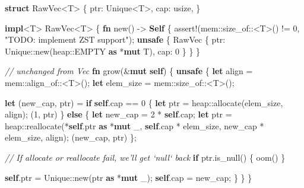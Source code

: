\documentclass[a4paper,]{book}
\newenvironment{Shaded}{\begin{snugshade}}{\end{snugshade}}
\newcommand{\KeywordTok}[1]{\textcolor[rgb]{0.13,0.29,0.53}{\textbf{{#1}}}}
\newcommand{\DecValTok}[1]{\textcolor[rgb]{0.00,0.00,0.81}{{#1}}}
\newcommand{\StringTok}[1]{\textcolor[rgb]{0.31,0.60,0.02}{{#1}}}
\newcommand{\CommentTok}[1]{\textcolor[rgb]{0.56,0.35,0.01}{\textit{{#1}}}}
\newcommand{\OtherTok}[1]{\textcolor[rgb]{0.56,0.35,0.01}{{#1}}}
\newcommand{\NormalTok}[1]{{#1}}
\begin{document}
\begin{Shaded}
\begin{Highlighting}[]
\KeywordTok{struct} \NormalTok{RawVec<T> \{}
    \NormalTok{ptr: Unique<T>,}
    \NormalTok{cap: usize,}
\NormalTok{\}}

\KeywordTok{impl}\NormalTok{<T> RawVec<T> \{}
    \KeywordTok{fn} \NormalTok{new() -> }\KeywordTok{Self} \NormalTok{\{}
        \OtherTok{assert!}\NormalTok{(mem::size_of::<T>() != }\DecValTok{0}\NormalTok{, }\StringTok{"TODO: implement ZST support"}\NormalTok{);}
        \KeywordTok{unsafe} \NormalTok{\{}
            \NormalTok{RawVec \{ ptr: Unique::new(heap::EMPTY }\KeywordTok{as} \NormalTok{*}\KeywordTok{mut} \NormalTok{T), cap: }\DecValTok{0} \NormalTok{\}}
        \NormalTok{\}}
    \NormalTok{\}}

    \CommentTok{// unchanged from Vec}
    \KeywordTok{fn} \NormalTok{grow(&}\KeywordTok{mut} \KeywordTok{self}\NormalTok{) \{}
        \KeywordTok{unsafe} \NormalTok{\{}
            \KeywordTok{let} \NormalTok{align = mem::align_of::<T>();}
            \KeywordTok{let} \NormalTok{elem_size = mem::size_of::<T>();}

            \KeywordTok{let} \NormalTok{(new_cap, ptr) = }\KeywordTok{if} \KeywordTok{self}\NormalTok{.cap == }\DecValTok{0} \NormalTok{\{}
                \KeywordTok{let} \NormalTok{ptr = heap::allocate(elem_size, align);}
                \NormalTok{(}\DecValTok{1}\NormalTok{, ptr)}
            \NormalTok{\} }\KeywordTok{else} \NormalTok{\{}
                \KeywordTok{let} \NormalTok{new_cap = }\DecValTok{2} \NormalTok{* }\KeywordTok{self}\NormalTok{.cap;}
                \KeywordTok{let} \NormalTok{ptr = heap::reallocate(*}\KeywordTok{self}\NormalTok{.ptr }\KeywordTok{as} \NormalTok{*}\KeywordTok{mut} \NormalTok{_,}
                                            \KeywordTok{self}\NormalTok{.cap * elem_size,}
                                            \NormalTok{new_cap * elem_size,}
                                            \NormalTok{align);}
                \NormalTok{(new_cap, ptr)}
            \NormalTok{\};}

            \CommentTok{// If allocate or reallocate fail, we'll get `null` back}
            \KeywordTok{if} \NormalTok{ptr.is_null() \{ oom() \}}

            \KeywordTok{self}\NormalTok{.ptr = Unique::new(ptr }\KeywordTok{as} \NormalTok{*}\KeywordTok{mut} \NormalTok{_);}
            \KeywordTok{self}\NormalTok{.cap = new_cap;}
        \NormalTok{\}}
    \NormalTok{\}}
\NormalTok{\}}



\end{Highlighting}
\end{Shaded}
\end{document}
